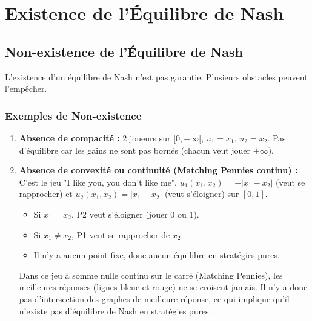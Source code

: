 \chapter{Existence de l'Équilibre de Nash}

\section{Non-existence de l'Équilibre de Nash}

L'existence d'un équilibre de Nash n'est pas garantie. Plusieurs obstacles peuvent l'empêcher.

\subsection{Exemples de Non-existence}
\begin{enumerate}
    \item \textbf{Absence de compacité :} 2 joueurs sur $[0, +\infty[$, $u_1 = x_1$, $u_2 = x_2$. Pas d'équilibre car les gains ne sont pas bornés (chacun veut jouer $+\infty$).
    \item \textbf{Absence de convexité ou continuité (Matching Pennies continu) :}
    C'est le jeu "I like you, you don't like me". $u_1(x_1, x_2) = -|x_1 - x_2|$ (veut se rapprocher) et $u_2(x_1, x_2) = |x_1 - x_2|$ (veut s'éloigner) sur $[0,1]$.
    \begin{itemize}
        \item Si $x_1 = x_2$, P2 veut s'éloigner (jouer $0$ ou $1$).
        \item Si $x_1 \ne x_2$, P1 veut se rapprocher de $x_2$.
        \item Il n'y a aucun point fixe, donc aucun équilibre en stratégies pures.
    \end{itemize}
    
\begin{center}
\end{center}
\begin{figureexplanation}
Dans ce jeu à somme nulle continu sur le carré (Matching Pennies), les meilleures réponses (lignes bleue et rouge) ne se croisent jamais. Il n'y a donc pas d'intersection des graphes de meilleure réponse, ce qui implique qu'il n'existe pas d'équilibre de Nash en stratégies pures.
\end{figureexplanation}

\end{enumerate}

